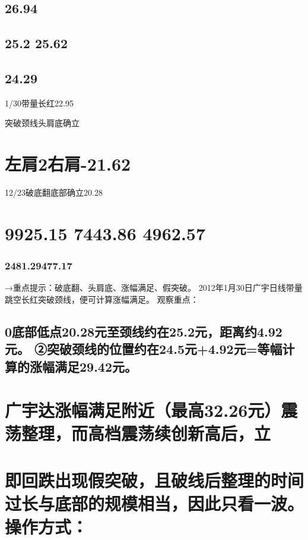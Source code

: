 \documentclass{article}
\begin{document}
\subsection{26.94}

\subsection{25.2 25.62}

\subsection{24.29}

1/30带量长红22.95

突破颈线头肩底确立

\section{左肩2右肩-21.62}

12/23破底翻底部确立20.28

\section{9925.15 7443.86 4962.57}

\subsubsection{2481.29477.17}

→重点提示：破底翻、头肩底、涨幅满足、假突破。 2012年1月30日广宇日线带量跳空长红突破颈线，便可计算涨幅满足。 观察重点：

\subsection{0底部低点20.28元至颈线约在25.2元，距离约4.92元。 ②突破颈线的位置约在24.5元+4.92元=等幅计算的涨幅满足29.42元。}

\section{广宇达涨幅满足附近（最高32.26元）震荡整理，而高档震荡续创新高后，立}

\section{即回跌出现假突破，且破线后整理的时间过长与底部的规模相当，因此只看一波。 操作方式：}
\end{document}
